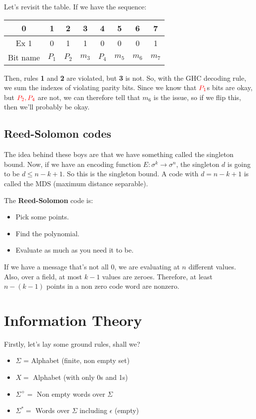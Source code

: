 \documentclass[11pt,a4paper,titlepage,dvipsnames,cmyk]{scrartcl}
\begin{document}
Let's revisit the table. If we have the sequence:
\begin{center}
    \begin{tabular}{c|c c c c c c c}
        0 & 1 & 2 & 3 & 4 & 5 & 6 & 7 \\
        \hline
        Ex 1 & 0 & 1 & 1 & 0 & 0 & 0 & 1 \\
        \hline
        Bit name & $P_1$& $P_2$& $m_3$& $P_4$& $m_5$& $m_6$& $m_7$
    \end{tabular}
\end{center}

Then, rules \textbf{1} and \textbf{2} are violated, but \textbf{3} is not.
So, with the GHC decoding rule, we sum the indexes of violating parity
bits. Since we know that ${\color{red}P_1}$s bits are okay, but
${\color{red}P_2, P_4}$ are not, we can therefore tell that $m_6$ is the
issue, so if we flip this, then we'll probably be okay.

\subsection{Reed-Solomon codes}%
\label{sub:reed-solomon}
The idea behind these boys are that we have something called the singleton
bound. Now, if we have an encoding function $E:\sigma^k \rightarrow
\sigma^n$, the singleton $d$ is going to be $d \le n-k+1$. So this is the
singleton bound. A code with $d = n - k + 1$ is called the MDS (maximum
distance separable).

The \textbf{Reed-Solomon} code is:
\begin{itemize}
    \item Pick some points.
    \item Find the polynomial.
    \item Evaluate as much as you need it to be.
\end{itemize}

If we have a message that's not all 0, we are evaluating at $n$ different
values. Also, over a field, at most $k-1$ values are zeroes. Therefore, at
least $n-(k-1)$ points in a non zero code word are nonzero.

\section{Information Theory}%
\label{sec:information-theory}
Firstly, let's lay some ground rules, shall we?

\begin{itemize}
    \item $\Sigma$ = Alphabet (finite, non empty set)
    \item $X =$ Alphabet (with only 0s and 1s)
    \item $\Sigma^+ =$ Non empty words over $\Sigma$
    \item $\Sigma^* =$ Words over $\Sigma$ including $\epsilon$ (empty)
\end{itemize}
\end{document}
